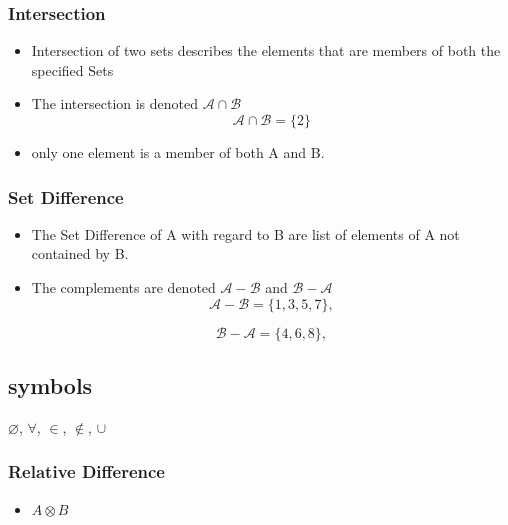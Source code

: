 
\subsubsection*{Intersection}
\begin{itemize}

\item Intersection of two sets describes the elements that are members of both the specified Sets

\item The intersection is denoted $\mathcal{A\cap B}$ 
\[ \mathcal{A\cap B} = \{2\}\]

\item only one element is a member of both A and B.
\end{itemize}

\subsubsection*{Set Difference}
\begin{itemize}

\item The Set Difference of A with regard to B are list of elements of A not contained by B.

\item The complements are denoted $\mathcal{A-B}$ and $\mathcal{B-A}$
\[ \mathcal{A-B} = \{1,3,5,7\}, \]

\[ \mathcal{B-A} = \{4,6,8\}, \]
\end{itemize}
\subsection*{symbols}
$\varnothing$,
$\forall$,
$\in$,
$\notin$,
$\cup$
\newpage


\subsubsection*{Relative Difference}
\begin{itemize}
\item $ A \otimes B$
\end{itemize}

